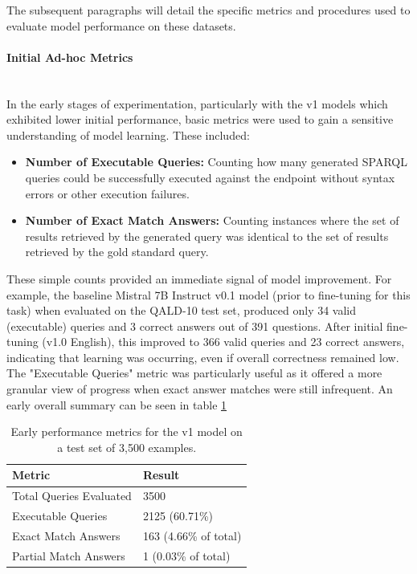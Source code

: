 The subsequent paragraphs will detail the specific metrics and procedures used to evaluate model performance on these datasets.

\paragraph{Initial Ad-hoc Metrics} \mbox{}\\
In the early stages of experimentation, particularly with the v1 models which exhibited lower initial performance, basic metrics were used to gain a sensitive understanding of model learning. These included:
\begin{itemize}
    \item \textbf{Number of Executable Queries:} Counting how many generated SPARQL queries could be successfully executed against the endpoint without syntax errors or other execution failures.
    \item \textbf{Number of Exact Match Answers:} Counting instances where the set of results retrieved by the generated query was identical to the set of results retrieved by the gold standard query.
\end{itemize}
These simple counts provided an immediate signal of model improvement. 
For example, the baseline Mistral 7B Instruct v0.1 model (prior to fine-tuning for this task) when evaluated on the QALD-10 test set, produced only 34 valid (executable) queries and 3 correct answers out of 391 questions. 
After initial fine-tuning (v1.0 English), this improved to 366 valid queries and 23 correct answers, indicating that learning was occurring, even if overall correctness remained low. 
The "Executable Queries" metric was particularly useful as it offered a more granular view of progress when exact answer matches were still infrequent. 
An early overall summary can be seen in table \ref{tab:early_v1_metrics}

\begin{table}[h!]
\centering
\caption{Early performance metrics for the v1 model on a test set of 3,500 examples.}
\label{tab:early_v1_metrics}
\begin{tabular}{ll}
\hline
\textbf{Metric} & \textbf{Result} \\
\hline
Total Queries Evaluated & 3500 \\
Executable Queries & 2125 (60.71\%) \\
Exact Match Answers & 163 (4.66\% of total) \\
Partial Match Answers & 1 (0.03\% of total) \\
\hline
\end{tabular}
\end{table}

